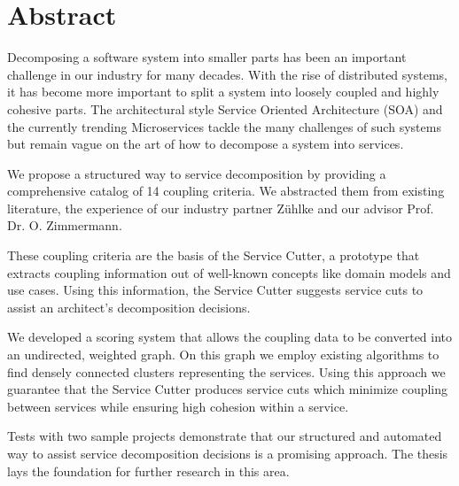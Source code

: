\chapter{Abstract}

Decomposing a software system into smaller parts has been an important challenge in our industry for many decades. With the rise of distributed systems, it has become more important to split a system into loosely coupled and highly cohesive parts. The architectural style Service Oriented Architecture (SOA) and the currently trending Microservices tackle the many challenges of such systems but remain vague on the art of how to decompose a system into services.

We propose a structured way to service decomposition by providing a comprehensive catalog of 14 coupling criteria. We abstracted them from existing literature, the experience of our industry partner Zühlke and our advisor Prof. Dr. O. Zimmermann.

These coupling criteria are the basis of the Service Cutter, a prototype that extracts coupling information out of well-known concepts like domain models and use cases. Using this information, the Service Cutter suggests service cuts to assist an architect’s decomposition decisions. 

We developed a scoring system that allows the coupling data to be converted into an undirected, weighted graph. On this graph we employ existing algorithms to find densely connected clusters representing the services. Using this approach we guarantee that the Service Cutter produces service cuts which minimize coupling between services while ensuring high cohesion within a service. 

Tests with two sample projects demonstrate that our structured and automated way to assist service decomposition decisions is a promising approach. The thesis lays the foundation for further research in this area.